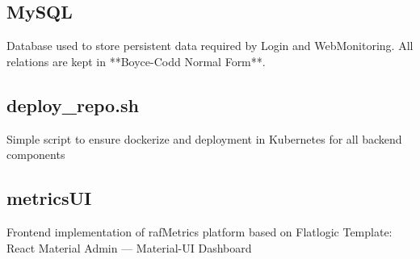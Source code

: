 \subsection{MySQL}
Database used to store persistent data required by Login and WebMonitoring.
All relations are kept in **Boyce-Codd Normal Form**.

\subsection{deploy\_repo.sh}
Simple script to ensure dockerize and deployment in Kubernetes for all backend components

\subsection{metricsUI}
Frontend implementation of rafMetrics platform based on Flatlogic Template: React Material Admin — Material-UI Dashboard
